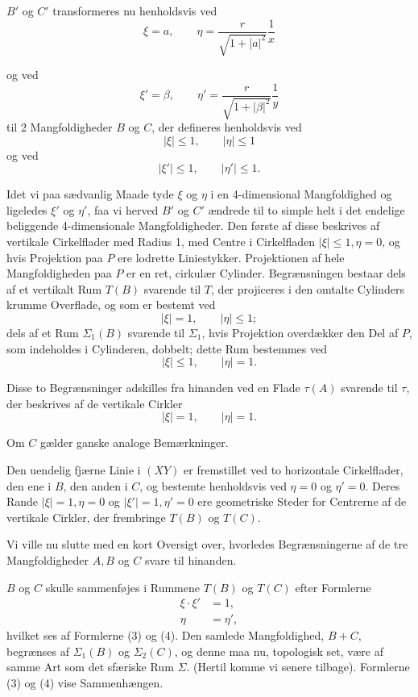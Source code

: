 \documentclass{article}
\begin{document}
$B'$ og $C'$ transformeres nu henholdsvis ved
\[
\xi = a, \qquad \eta = \frac{r}{\sqrt{1 + |a|^2}} \frac{1}{x} \tag{3}
\]

og ved
\[
\xi' = \beta, \qquad \eta' = \frac{r}{\sqrt{1 + |\beta|^2}} \frac{1}{y} \tag{4}
\]
til 2 Mangfoldigheder $B$ og $C$, der defineres henholdsvis ved
\[
|\xi| \le 1, \qquad |\eta| \le 1
\]
og ved
\[
|\xi'| \le 1, \qquad |\eta'| \le 1.
\]

Idet vi paa sædvanlig Maade tyde $\xi$ og $\eta$ i en 4-dimensional Mangfoldighed og ligeledes $\xi'$ og $\eta'$, faa vi herved $B'$ og $C'$ ændrede til to simple helt i det endelige beliggende 4-dimensionale Mangfoldigheder. Den første af disse beskrives af vertikale Cirkelflader med Radius 1, med Centre i Cirkelfladen $|\xi| \le 1, \eta = 0$, og hvis Projektion paa $P$ ere lodrette Liniestykker. Projektionen af hele Mangfoldigheden paa $P$ er en ret, cirkulær Cylinder. Begrænsningen bestaar dels af et vertikalt Rum $T(B)$ svarende til $T$, der projiceres i den omtalte Cylinders krumme Overflade, og som er bestemt ved
\[
|\xi| = 1, \qquad |\eta| \le 1;
\]
dels af et Rum $\Sigma_1(B)$ svarende til $\Sigma_1$, hvis Projektion overdækker den Del af $P$, som indeholdes i Cylinderen, dobbelt; dette Rum bestemmes ved
\[
|\xi| \le 1, \qquad |\eta| = 1.
\]

Disse to Begrænsninger adskilles fra hinanden ved en Flade $\tau(A)$ svarende til $\tau$, der beskrives af de vertikale Cirkler
\[
|\xi| = 1, \qquad |\eta| = 1.
\]

Om $C$ gælder ganske analoge Bemærkninger.

Den uendelig fjærne Linie i $(XY)$ er fremstillet ved to horizontale Cirkelflader, den ene i $B$, den anden i $C$, og bestemte henholdsvis ved $\eta = 0$ og $\eta' = 0$. Deres Rande $|\xi| = 1, \eta = 0$ og $|\xi'| = 1, \eta' = 0$ ere geometriske Steder for Centrerne af de vertikale Cirkler, der frembringe $T(B)$ og $T(C)$.

Vi ville nu slutte med en kort Oversigt over, hvorledes Begrænsningerne af de tre Mangfoldigheder $A, B$ og $C$ svare til hinanden.

$B$ og $C$ skulle sammenføjes i Rummene $T(B)$ og $T(C)$ efter Formlerne
\[
\begin{aligned}
\xi \cdot \xi' &= 1, \\
\eta &= \eta',
\end{aligned} \tag{5}
\]
hvilket ses af Formlerne (3) og (4). Den samlede Mangfoldighed, $B + C$, begrænses af $\Sigma_1(B)$ og $\Sigma_2(C)$, og denne maa nu, topologisk set, være af samme Art som det sfæriske Rum $\Sigma$. (Hertil komme vi senere tilbage). Formlerne (3) og (4) vise Sammenhængen.
\end{document}
